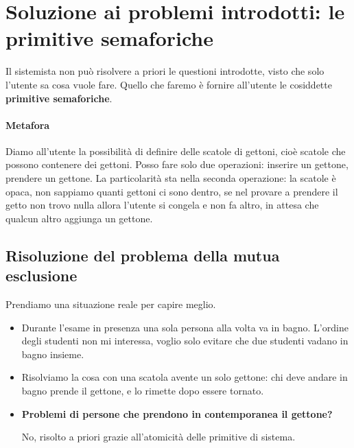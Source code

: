 \section{Soluzione ai problemi introdotti: le primitive semaforiche} 
Il sistemista non può risolvere a priori le questioni introdotte, visto che solo l'utente sa cosa vuole fare. Quello che faremo è fornire all'utente le cosiddette \textbf{primitive semaforiche}.
\paragraph{Metafora}  Diamo all'utente la possibilità di definire delle scatole di gettoni, cioè scatole che possono contenere dei gettoni. Posso fare solo due operazioni: inserire un gettone, prendere un gettone. La particolarità sta nella seconda operazione: la scatole è opaca, non sappiamo quanti gettoni ci sono dentro, se nel provare a prendere il getto non trovo nulla allora l'utente si congela e non fa altro, in attesa che qualcun altro aggiunga un gettone.



\subsection{Risoluzione del problema della mutua esclusione}
Prendiamo una situazione reale per capire meglio.
\begin{itemize}
	\item Durante l'esame in presenza una sola persona alla volta va in bagno. L'ordine degli studenti non mi interessa, voglio solo evitare che due studenti vadano in bagno insieme. 
	\item Risolviamo la cosa con una scatola avente un solo gettone: chi deve andare in bagno prende il gettone, e lo rimette dopo essere tornato. 
	
	\item \textbf{Problemi di persone che prendono in contemporanea il gettone?} 
	
	No, risolto a priori grazie all'atomicità delle primitive di sistema. 
\end{itemize}
